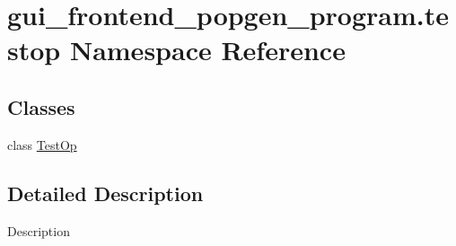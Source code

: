 \hypertarget{namespacegui__frontend__popgen__program_1_1testop}{}\section{gui\+\_\+frontend\+\_\+popgen\+\_\+program.\+testop Namespace Reference}
\label{namespacegui__frontend__popgen__program_1_1testop}
\subsection*{Classes}
\begin{DoxyCompactItemize}
\item 
class \hyperlink{classgui__frontend__popgen__program_1_1testop_1_1TestOp}{Test\+Op}
\end{DoxyCompactItemize}


\subsection{Detailed Description}
\begin{DoxyVerb}Description
\end{DoxyVerb}
 